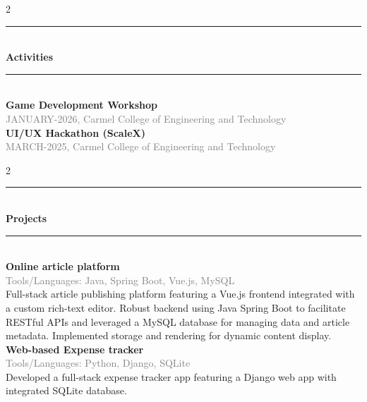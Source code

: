 \documentclass[10pt, a4paper]{article}
\begin{document}
\begin{paracol}{2}
\rule{0.1\linewidth}{1pt} \\[10px]
\textbf{\selectfont \Large Activities} \\[5px]
\switchcolumn
\rule{\linewidth}{2pt} \\[10px]
\textbf{Game Development Workshop} \\
\textcolor{gray}{JANUARY-2026, Carmel College of Engineering and Technology} \\[5px]
\textbf{UI/UX Hackathon (ScaleX)} \\
\textcolor{gray}{MARCH-2025, Carmel College of Engineering and Technology} \\
\end{paracol}

\begin{paracol}{2}
\rule{0.1\linewidth}{1pt} \\[10px]
\textbf{\selectfont \Large Projects} \\[5px]
\switchcolumn
\rule{\linewidth}{2pt} \\[10px]
\textbf{Online article platform} \\
\textcolor{gray}{Tools/Languages: Java, Spring Boot, Vue.js, MySQL} \\[5px]
Full-stack article publishing platform featuring a Vue.js frontend integrated with a custom rich-text editor. Robust backend using Java Spring Boot to facilitate RESTful APIs and leveraged a MySQL database for managing data and article metadata. Implemented storage and rendering for dynamic content display.\\[5px]
\textbf{Web-based Expense tracker} \\
\textcolor{gray}{Tools/Languages: Python, Django, SQLite} \\
Developed a full-stack expense tracker app featuring a Django web app with integrated SQLite database.
\end{paracol}
\end{document}
